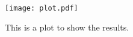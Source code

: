 
\begin{figure}[htb]
\centering
\texttt{[image: plot.pdf]}
\caption{This is a plot to show the results.}
\label{fig:Plot}
\end{figure}